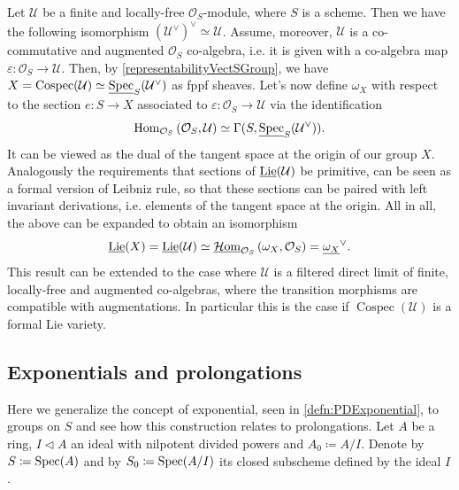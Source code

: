 \begin{rem}\label{LieDualConormalSheaf}
	Let $\mathcal{U}$ be a finite and locally-free $\mathcal{O}_{ S }$-module,
	where $S$ is a scheme.
	Then we have the following isomorphism $(\mathcal{U}^\vee)^\vee \simeq \mathcal{U}$.
	Assume, moreover, \(\mathcal{U}\) is a co-commutative and
	augmented \(\mathcal{O}_{ S }\) co-algebra, i.e$.$
	it is given with a co-algebra map
	\(\varepsilon\colon \mathcal{O}_{ S } \to \mathcal{U}\).
	Then, by \cref{representabilityVectSGroup},
	we have $X = \operatorname{Cospec}(\mathcal{U}) \simeq 
	\underline{\operatorname{Spec}}_S(\mathcal{U}^\vee)$ as fppf sheaves.
	Let's now define $\omega_X$ with respect to the section $e\colon S \to X$
	associated to $\varepsilon\colon \mathcal{O}_{ S } \to \mathcal{U}$
	via the identification
	\begin{equation*}
		\operatorname{Hom}_{ \mathcal{O}_{ S }}
		\left( \mathcal{O}_{ S }, \mathcal{U} \right) 
		\simeq
		\Gamma(S, \underline{\operatorname{Spec}}_S(\mathcal{U}^\vee))
	.\end{equation*}
	It can be viewed as the dual of the tangent space at the origin
	of our group $X$.
	Analogously the requirements that sections of $\underline{\operatorname{Lie}}(\mathcal{U})$
	be primitive, can be seen as a formal version of Leibniz rule,
	so that these sections can be paired with left invariant derivations, i.e$.$
	elements of the tangent space at the origin.
	All in all, the above can be expanded to obtain an isomorphism
	\begin{equation*}
		\underline{\operatorname{Lie}}(X) =
		\underline{\operatorname{Lie}}(\mathcal{U}) \simeq
		\underline{\mathcal{H}\mathrm{om}}_{ \mathcal{O}_{ S } } 
		\left(\omega_X , \mathcal{O}_{ S } \right) =
		\underline{\omega_X}^\vee
	.\end{equation*}
	This result can be extended to the case where \(\mathcal{U}\)
	is a filtered direct limit of finite, locally-free and augmented co-algebras,
	where the transition morphisms are compatible with augmentations.
	In particular this is the case if \(\operatorname{Cospec}(\mathcal{U})\)
	is a formal Lie variety.
\end{rem}


\subsection{Exponentials and prolongations}
Here we generalize the concept of exponential, seen in \cref{defn:PDExponential},
to groups on $S$ and see how this construction relates to prolongations.
Let $A$ be a ring, $I \triangleleft A$ an ideal with nilpotent
divided powers and $A_0 \coloneqq A/I$.
Denote by $S \coloneqq \operatorname{Spec}(A)$
and by $S_0 \coloneqq \operatorname{Spec}(A/I)$ its closed
subscheme defined by the ideal $I$.



